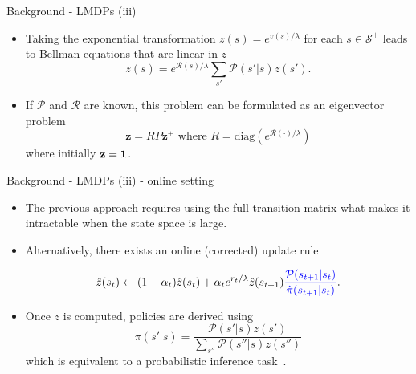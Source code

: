 \documentclass{beamer}
\theoremstyle{mystyle}
\newcommand{\cP}{\mathcal{P}}
\newcommand{\cR}{\mathcal{R}}
\newcommand{\cS}{\mathcal{S}}
\begin{document}
\begin{frame}{Background - LMDPs (iii)}
    
    \begin{itemize}
         \item Taking the exponential transformation $z(s)=e^{v(s)/\lambda}$ for each $s\in\cS^+$ leads to Bellman equations that are linear in $z$ \[ z(s) = e^{\cR(s)/\lambda} \sum_{s'}\cP(s'|s)z(s'). \]
         \item If $\cP$ and $\cR$ are known, this problem can be formulated as an eigenvector problem \[ \mathbf{z} = R P \mathbf{z^+} \text{  where  } R=\text{diag}(e^{\cR(\cdot)/\lambda}) \] where initially 
         $\mathbf z  = \bf 1$.
        \end{itemize}
\end{frame}

\begin{frame}{Background - LMDPs (iii) - online setting}

\begin{itemize}
\item The previous approach requires using the full transition matrix what makes it {\color{blue} intractable} when the state space is large.
\item Alternatively, there exists an online {\color{blue} (corrected)} update rule  
        
         \[ \hat{z}(s_t) \leftarrow (1-\alpha_t) \hat{z}(s_t) + \alpha_t e^{r_t/\lambda}\hat{z}(s_{t+1}) {\color{blue} \frac {\cP(s_{t+1}|s_t)} {\hat{\pi}(s_{t+1}|s_t)}}. \]
         
\item Once $z$ is computed, policies are derived using \[ \pi(s'|s) = \frac {\cP(s'|s)z(s')} {\sum_{s''} \cP(s''|s)z(s'')}\]
    which is equivalent to a probabilistic inference task~\cite{KappenML2012}.
\end{itemize}
\end{frame}
\end{document}
